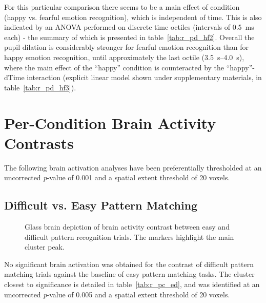 	    For this particular comparison there seems to be a main effect of condition (happy vs. fearful emotion recognition), which is independent of time.
	    This is also indicated by an ANOVA performed on discrete time octiles (intervals of \SI{0.5}{\milli\second} each) - the summary of which is presented in table~\ref{tab:r_pd_hf2}.
	    Overall the pupil dilation is considerably stronger for fearful emotion recognition than for happy emotion recognition, until approximately the last octile (\SIrange{3.5}{4.0}{\second}), where the main effect of the “happy” condition is counteracted by the “happy”-dTime interaction (explicit linear model shown under supplementary materials, in table~\ref{tab:r_pd_hf3}).
	    
    \section{Per-Condition Brain Activity Contrasts}\label{sec:r_pc}
	The following brain activation analyses have been preferentially thresholded at an uncorrected \textit{p}-value of 0.001 and a spatial extent threshold of 20 voxels.
	\subsection{Difficult vs. Easy Pattern Matching}\label{sec:r_pc_ed}
	    \begin{wrapfigure}{r}{0.5\textwidth}
		\centering
		\vspace{-1.8cm}
		\caption{Glass brain depiction of brain activity contrast between easy and difficult pattern recognition trials. The markers highlight the main cluster peak.}
		\label{fig:r_pc_ed}
		\vspace{-0.8cm}
	    \end{wrapfigure}
	    No significant brain activation was obtained for the contrast of difficult pattern matching trials against the baseline of easy pattern matching tasks.
	    The cluster closest to significance is detailed in table~\ref{tab:r_pc_ed}, and was identified at an uncorrected \textit{p}-value of 0.005 and a spatial extent threshold of 20 voxels.
	    
